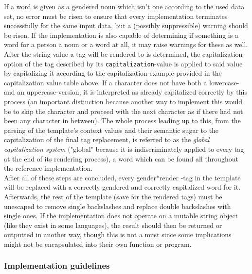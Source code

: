 \documentclass{article}
\newcommand{\GenderRender}{
    gender*render
}
\begin{document}
    If a word is given as a gendered noun which isn't one according to the used data set, no error must be risen to ensure that every implementation terminates successfully for the same input data, but a (possibly suppressible) warning should be risen.
    If the implementation is also capable of determining if something is a word for a person a noun or a word at all, it may raise warnings for these as well.\\

    After the string value a tag will be rendered to is determined, the capitalization option of the tag described by its \texttt{capitalization}-value is applied to said value by capitalizing it according to the capitalization-example provided in the capitalization value table above.
    If a character does not have both a lowercase- and an uppercase-version, it is interpreted as already capitalized correctly by this process (an important distinction because another way to implement this would be to skip the character and proceed with the next character as if there had not been any character in between).
    The whole process leading up to this, from the parsing of the template's context values and their semantic sugar to the capitalization of the final tag replacement, is referred to as the \emph{global capitalization system} ("global" because it is indiscriminately applied to every tag at the end of its rendering process), a word which can be found all throughout the reference implementation.\\

    After all of these steps are concluded, every \GenderRender-tag in the template will be replaced with a correctly gendered and correctly capitalized word for it.
    Afterwards, the rest of the template (save for the rendered tags) must be unescaped to remove single backslashes and replace double backslashes with single ones.
    If the implementation does not operate on a mutable string object (like they exist in some languages), the result should then be returned or outputted in another way, though this is not a must since some implications might not be encapsulated into their own function or program.\\

    \subsubsection{Implementation guidelines}
\end{document}
